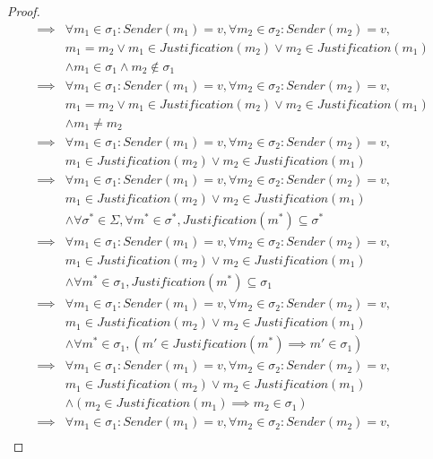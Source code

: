 \begin{proof}
\begin{align}
  \implies&\forall m_1 \in \sigma_1: Sender(m_1) = v, \forall m_2 \in \sigma_2: Sender(m_2) = v, \\
          &m_1 = m_2 \lor m_1 \in Justification(m_2) \lor m_2 \in Justification(m_1) \\
          &\land m_1 \in \sigma_1 \land m_2 \notin \sigma_1 \\
  \implies&\forall m_1 \in \sigma_1: Sender(m_1) = v, \forall m_2 \in \sigma_2: Sender(m_2) = v, \\
          &m_1 = m_2 \lor m_1 \in Justification(m_2) \lor m_2 \in Justification(m_1) \\
          &\land m_1 \neq m_2 \\
  \implies&\forall m_1 \in \sigma_1: Sender(m_1) = v, \forall m_2 \in \sigma_2: Sender(m_2) = v, \\
          &m_1 \in Justification(m_2) \lor m_2 \in Justification(m_1) \\
  \implies&\forall m_1 \in \sigma_1: Sender(m_1) = v, \forall m_2 \in \sigma_2: Sender(m_2) = v, \\
          &m_1 \in Justification(m_2) \lor m_2 \in Justification(m_1) \\
          &\land \forall \sigma^* \in \Sigma, \forall m^* \in \sigma^*, Justification(m^*) \subseteq \sigma^* \\
  \implies&\forall m_1 \in \sigma_1: Sender(m_1) = v, \forall m_2 \in \sigma_2: Sender(m_2) = v, \\
          &m_1 \in Justification(m_2) \lor m_2 \in Justification(m_1) \\
          &\land \forall m^* \in \sigma_1, Justification(m^*) \subseteq \sigma_1 \\
  \implies&\forall m_1 \in \sigma_1: Sender(m_1) = v, \forall m_2 \in \sigma_2: Sender(m_2) = v, \\
          &m_1 \in Justification(m_2) \lor m_2 \in Justification(m_1) \\
          &\land \forall m^* \in \sigma_1, (m' \in Justification(m^*) \implies m' \in \sigma_1) \\
  \implies&\forall m_1 \in \sigma_1: Sender(m_1) = v, \forall m_2 \in \sigma_2: Sender(m_2) = v, \\
          &m_1 \in Justification(m_2) \lor m_2 \in Justification(m_1) \\
          &\land (m_2 \in Justification(m_1) \implies m_2 \in \sigma_1) \\
  \implies&\forall m_1 \in \sigma_1: Sender(m_1) = v, \forall m_2 \in \sigma_2: Sender(m_2) = v, \\

\end{align}
\end{proof}
